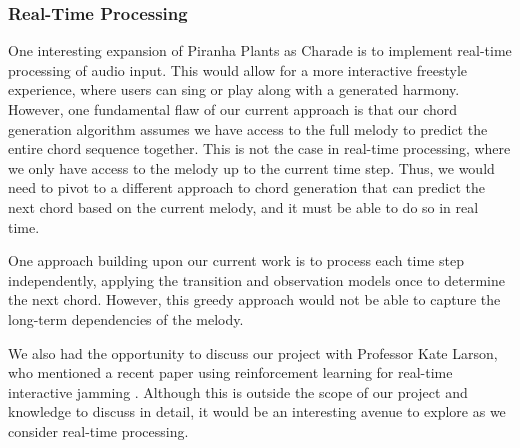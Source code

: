 \subsubsection{Real-Time Processing}

One interesting expansion of Piranha Plants as Charade is to implement real-time processing of audio input. This would allow for a more interactive freestyle experience, where users can sing or play along with a generated harmony. However, one fundamental flaw of our current approach is that our chord generation algorithm assumes we have access to the full melody to predict the entire chord sequence together. This is not the case in real-time processing, where we only have access to the melody up to the current time step. Thus, we would need to pivot to a different approach to chord generation that can predict the next chord based on the current melody, and it must be able to do so in real time.

One approach building upon our current work is to process each time step independently, applying the transition and observation models once to determine the next chord. However, this greedy approach would not be able to capture the long-term dependencies of the melody.

We also had the opportunity to discuss our project with Professor Kate Larson, who mentioned a recent paper using reinforcement learning for real-time interactive jamming \autocite{ReaLJam:2025}. Although this is outside the scope of our project and knowledge to discuss in detail, it would be an interesting avenue to explore as we consider real-time processing.

